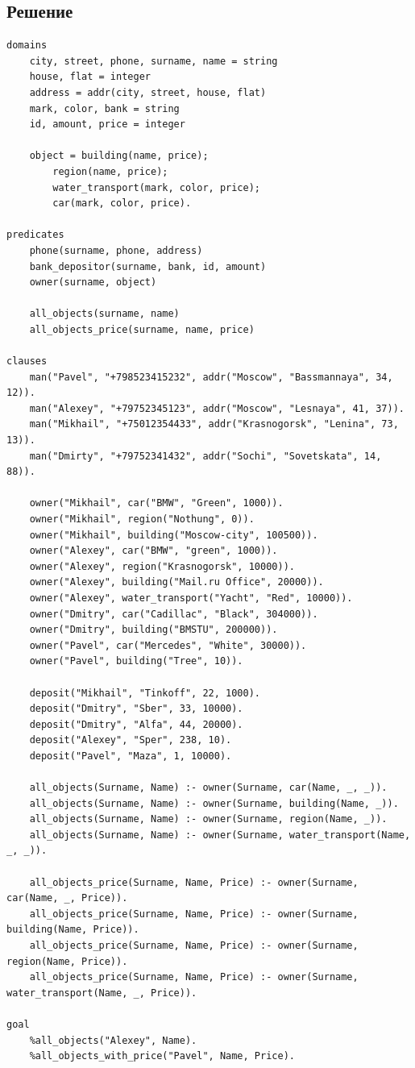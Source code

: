 \documentclass[12pt]{report}
\begin{document}
\subsection*{Решение}
\begin{lstlisting}
domains
	city, street, phone, surname, name = string
	house, flat = integer
	address = addr(city, street, house, flat)
	mark, color, bank = string
	id, amount, price = integer

	object = building(name, price);
		region(name, price);
		water_transport(mark, color, price);
		car(mark, color, price).

predicates
	phone(surname, phone, address)
	bank_depositor(surname, bank, id, amount)
	owner(surname, object)

	all_objects(surname, name)
	all_objects_price(surname, name, price)

clauses
	man("Pavel", "+798523415232", addr("Moscow", "Bassmannaya", 34, 12)).
	man("Alexey", "+79752345123", addr("Moscow", "Lesnaya", 41, 37)).
	man("Mikhail", "+75012354433", addr("Krasnogorsk", "Lenina", 73, 13)).
	man("Dmirty", "+79752341432", addr("Sochi", "Sovetskata", 14, 88)).

	owner("Mikhail", car("BMW", "Green", 1000)).
	owner("Mikhail", region("Nothung", 0)).
	owner("Mikhail", building("Moscow-city", 100500)).
	owner("Alexey", car("BMW", "green", 1000)).
	owner("Alexey", region("Krasnogorsk", 10000)).
	owner("Alexey", building("Mail.ru Office", 20000)).
	owner("Alexey", water_transport("Yacht", "Red", 10000)).
	owner("Dmitry", car("Cadillac", "Black", 304000)).
	owner("Dmitry", building("BMSTU", 200000)).
	owner("Pavel", car("Mercedes", "White", 30000)).
	owner("Pavel", building("Tree", 10)).
	
	deposit("Mikhail", "Tinkoff", 22, 1000).
	deposit("Dmitry", "Sber", 33, 10000).
	deposit("Dmitry", "Alfa", 44, 20000).
	deposit("Alexey", "Sper", 238, 10).
	deposit("Pavel", "Maza", 1, 10000).
	
	all_objects(Surname, Name) :- owner(Surname, car(Name, _, _)).
	all_objects(Surname, Name) :- owner(Surname, building(Name, _)).
	all_objects(Surname, Name) :- owner(Surname, region(Name, _)).
	all_objects(Surname, Name) :- owner(Surname, water_transport(Name, _, _)).
	
	all_objects_price(Surname, Name, Price) :- owner(Surname, car(Name, _, Price)).
	all_objects_price(Surname, Name, Price) :- owner(Surname, building(Name, Price)).
	all_objects_price(Surname, Name, Price) :- owner(Surname, region(Name, Price)).
	all_objects_price(Surname, Name, Price) :- owner(Surname, water_transport(Name, _, Price)).

goal
	%all_objects("Alexey", Name).
	%all_objects_with_price("Pavel", Name, Price).

\end{lstlisting}
\end{document}
